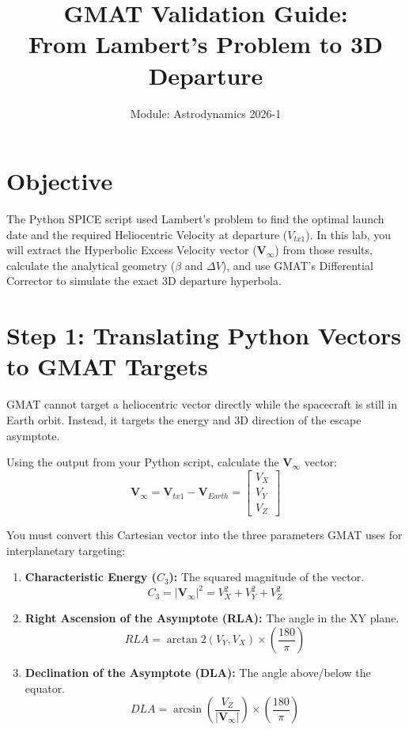 \documentclass[12pt]{article}
\title{\textbf{GMAT Validation Guide: \\ From Lambert's Problem to 3D Departure}}
\author{Module: Astrodynamics 2026-1}
\date{}
\begin{document}
\maketitle

\section*{Objective}
The Python SPICE script used Lambert's problem to find the optimal launch date and the required Heliocentric Velocity at departure ($V_{tx1}$). In this lab, you will extract the Hyperbolic Excess Velocity vector ($\mathbf{V}_\infty$) from those results, calculate the analytical geometry ($\beta$ and $\Delta V$), and use GMAT's Differential Corrector to simulate the exact 3D departure hyperbola.

\section*{Step 1: Translating Python Vectors to GMAT Targets}
GMAT cannot target a heliocentric vector directly while the spacecraft is still in Earth orbit. Instead, it targets the energy and 3D direction of the escape asymptote. 

Using the output from your Python script, calculate the $\mathbf{V}_\infty$ vector:
\begin{equation}
    \mathbf{V}_\infty = \mathbf{V}_{tx1} - \mathbf{V}_{Earth} = \begin{bmatrix} V_X \\ V_Y \\ V_Z \end{bmatrix}
\end{equation}

You must convert this Cartesian vector into the three parameters GMAT uses for interplanetary targeting:
\begin{enumerate}
    \item \textbf{Characteristic Energy ($C_3$):} The squared magnitude of the vector.
    \begin{equation}
        C_3 = |\mathbf{V}_\infty|^2 = V_X^2 + V_Y^2 + V_Z^2
    \end{equation}
    \item \textbf{Right Ascension of the Asymptote (RLA):} The angle in the XY plane.
    \begin{equation}
        RLA = \arctan2(V_Y, V_X) \times \left(\frac{180}{\pi}\right)
    \end{equation}
    \item \textbf{Declination of the Asymptote (DLA):} The angle above/below the equator.
    \begin{equation}
        DLA = \arcsin\left(\frac{V_Z}{|\mathbf{V}_\infty|}\right) \times \left(\frac{180}{\pi}\right)
    \end{equation}
\end{enumerate}
\end{document}
